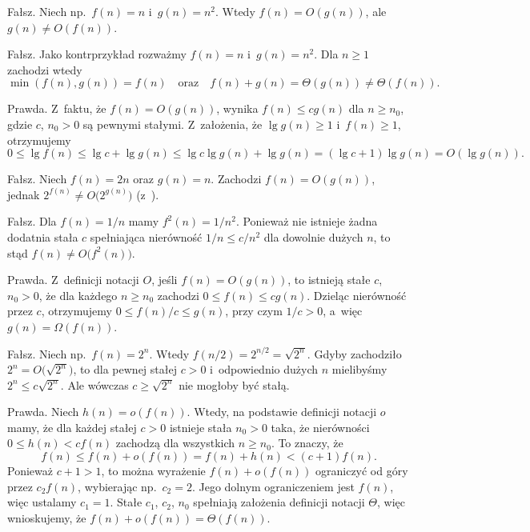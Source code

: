 
\subproblem %
Fałsz.
Niech np.\ $f(n)=n$ i~$g(n)=n^2$.
Wtedy $f(n)=O(g(n))$, ale $g(n)\ne O(f(n))$.

\subproblem %
Fałsz.
Jako kontrprzykład rozważmy $f(n)=n$ i~$g(n)=n^2$.
Dla $n\ge1$ zachodzi wtedy
\[
	\min(f(n),g(n)) = f(n) \quad\text{oraz}\quad f(n)+g(n) = \Theta(g(n)) \ne \Theta(f(n)).
\]

\subproblem %
Prawda.
Z~faktu, że $f(n)=O(g(n))$, wynika $f(n)\le cg(n)$ dla $n\ge n_0$, gdzie $c$, $n_0>0$ są pewnymi stałymi.
Z~założenia, że $\lg g(n)\ge1$ i~$f(n)\ge1$, otrzymujemy
\[
	0 \le \lg f(n) \le \lg c+\lg g(n) \le \lg c\lg g(n)+\lg g(n) = (\lg c+1)\lg g(n) = O(\lg g(n)).
\]

\subproblem %
Fałsz.
Niech $f(n)=2n$ oraz $g(n)=n$.
Zachodzi $f(n)=O(g(n))$, jednak $2^{f(n)}\ne O\bigl(2^{g(n)}\bigr)$ (z~).

\subproblem %
Fałsz.
Dla $f(n)=1/n$ mamy $f^2(n)=1/n^2$.
Ponieważ nie istnieje żadna dodatnia stała $c$ spełniająca nierówność $1/n\le c/n^2$ dla dowolnie dużych $n$, to stąd $f(n)\ne O\bigl(f^2(n)\bigr)$.

\subproblem %
Prawda.
Z~definicji notacji $O$, jeśli $f(n)=O(g(n))$, to istnieją stałe $c$, $n_0>0$, że dla każdego $n\ge n_0$ zachodzi $0\le f(n)\le cg(n)$.
Dzieląc nierówność przez $c$, otrzymujemy $0\le f(n)/c\le g(n)$, przy czym $1/c>0$, a~więc $g(n)=\Omega(f(n))$.

\subproblem %
Fałsz.
Niech np.\ $f(n)=2^n$.
Wtedy $f(n/2)=2^{n/2}=\sqrt{2^n}$.
Gdyby zachodziło $2^n=O\bigl(\!\sqrt{2^n}\bigr)$, to dla pewnej stałej $c>0$ i~odpowiednio dużych $n$ mielibyśmy $2^n\le c\sqrt{2^n}$.
Ale wówczas $c\ge\sqrt{2^n}$ nie mogłoby być stałą.

\subproblem %
Prawda.
Niech $h(n)=o(f(n))$.
Wtedy, na podstawie definicji notacji $o$ mamy, że dla każdej stałej $c>0$ istnieje stała $n_0>0$ taka, że nierówności $0\le h(n)<cf(n)$ zachodzą dla wszystkich $n\ge n_0$.
To znaczy, że
\[
	f(n) \le f(n)+o(f(n)) = f(n)+h(n) < (c+1)f(n).
\]
Ponieważ $c+1>1$, to można wyrażenie $f(n)+o(f(n))$ ograniczyć od góry przez $c_2f(n)$, wybierając np.\ $c_2=2$.
Jego dolnym ograniczeniem jest $f(n)$, więc ustalamy $c_1=1$.
Stałe $c_1$, $c_2$, $n_0$ spełniają założenia definicji notacji $\Theta$, więc wnioskujemy, że $f(n)+o(f(n))=\Theta(f(n))$.
